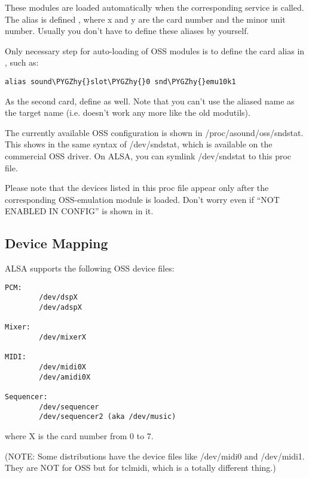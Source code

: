 \documentclass[a4paper,8pt,english]{sphinxmanual}
\def\PYGZhy{\char`\-}
\begin{document}
These modules are loaded automatically when the corresponding service
is called.  The alias is defined , where x and y are
the card number and the minor unit number.  Usually you don't have to
define these aliases by yourself.

Only necessary step for auto-loading of OSS modules is to define the
card alias in , such as:

\begin{Verbatim}[commandchars=\\\{\}]
alias sound\PYGZhy{}slot\PYGZhy{}0 snd\PYGZhy{}emu10k1
\end{Verbatim}

As the second card, define  as well.
Note that you can't use the aliased name as the target name (i.e.
 doesn't work any more like the old
modutils).

The currently available OSS configuration is shown in
/proc/asound/oss/sndstat.  This shows in the same syntax of
/dev/sndstat, which is available on the commercial OSS driver.
On ALSA, you can symlink /dev/sndstat to this proc file.

Please note that the devices listed in this proc file appear only
after the corresponding OSS-emulation module is loaded.  Don't worry
even if ``NOT ENABLED IN CONFIG'' is shown in it.


\subsection{Device Mapping}
\label{sound/designs/oss-emulation:device-mapping}
ALSA supports the following OSS device files:

\begin{Verbatim}[commandchars=\\\{\}]
PCM:
        /dev/dspX
        /dev/adspX

Mixer:
        /dev/mixerX

MIDI:
        /dev/midi0X
        /dev/amidi0X

Sequencer:
        /dev/sequencer
        /dev/sequencer2 (aka /dev/music)
\end{Verbatim}

where X is the card number from 0 to 7.

(NOTE: Some distributions have the device files like /dev/midi0 and
/dev/midi1.  They are NOT for OSS but for tclmidi, which is
a totally different thing.)
\end{document}
